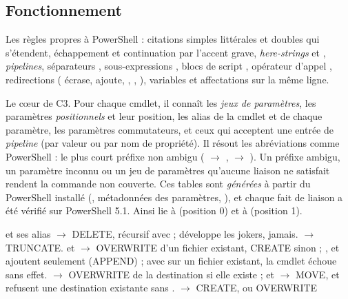 \subsection{Fonctionnement}
\begin{description}[style=nextline,leftmargin=0.6cm,font=\sffamily\bfseries]
  \item[Analyse lexicale et syntaxique]
    Les règles propres à PowerShell : citations simples littérales et doubles qui
    s'étendent, échappement et continuation par l'accent grave, \textit{here-strings}
     et , \textit{pipelines}, séparateurs \cmd{;},
    sous-expressions \cmd{\$(\ldots)}, blocs de script \cmd{\{\ldots\}}, opérateur d'appel
    \cmd{\&}, redirections (\cmd{>} écrase, \cmd{>>} ajoute, , \cmd{*>},
    ), variables  et affectations sur la même ligne.
  \item[Lieur de paramètres]
    Le cœur de C3. Pour chaque cmdlet, il connaît les \emph{jeux de paramètres}, les paramètres
    \emph{positionnels} et leur position, les alias de la cmdlet et de chaque paramètre, les
    paramètres commutateurs, et ceux qui acceptent une entrée de \textit{pipeline} (par valeur
    ou par nom de propriété). Il résout les abréviations comme PowerShell : le plus court
    préfixe non ambigu ( $\rightarrow$ ,  $\rightarrow$
    ). Un préfixe ambigu, un paramètre inconnu ou un jeu de paramètres
    qu'aucune liaison ne satisfait rendent la commande non couverte. Ces tables sont \emph{générées} à partir du PowerShell installé
    (, métadonnées des paramètres, ), et chaque fait de liaison
    a été vérifié sur PowerShell 5.1. Ainsi  lie  à
     (position 0) et  à  (position 1).
  \item[Effets par cmdlet]
     et ses alias $\rightarrow$ DELETE, récursif avec  ;
     développe les jokers,  jamais. 
    $\rightarrow$ TRUNCATE.  et  $\rightarrow$ OVERWRITE d'un
    fichier existant, CREATE sinon ; ,  et \cmd{>>} ajoutent
    seulement (APPEND) ; avec  sur un fichier existant, la cmdlet échoue sans
    effet.  $\rightarrow$ OVERWRITE de la destination si elle
    existe ;  et  $\rightarrow$ MOVE, et refusent une
    destination existante sans .  $\rightarrow$ CREATE, ou OVERWRITE

\end{description}
